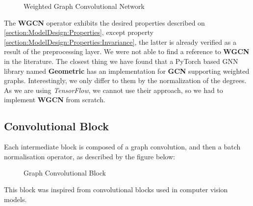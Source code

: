 \begin{figure}[H]
	\noindent
	
	\caption{Weighted Graph Convolutional Network \label{fig:WGCN}}
\end{figure}
\FloatBarrier
The \textbf{WGCN} operator exhibits the desired properties described on \ref{section:ModelDesign:Properties}, except property  \ref{section:ModelDesign:Properties:Invariance}, the latter is already verified as a result of the preprocessing layer.
\newline We were not able to find a reference to \textbf{WGCN} in the literature. The closest thing we have found that a PyTorch based GNN library named \textbf{Geometric} has an implementation for \textbf{GCN} supporting weighted graphs. Interestingly, we only differ to them by the normalization of the degrees.
\newline As we are using \textit{TensorFlow}, we cannot use their approach, so we had to implement \textbf{WGCN} from scratch.

\subsection{Convolutional Block}
Each intermediate block is composed of a graph convolution, and then a batch normalisation operator, as described by the figure below:
\begin{figure}[H]
	\noindent
	
	\caption{Graph Convolutional Block}
	\label{fig:ConvolutionalBlock}
\end{figure}
\FloatBarrier
This block was inspired from convolutional blocks used in computer vision models.
